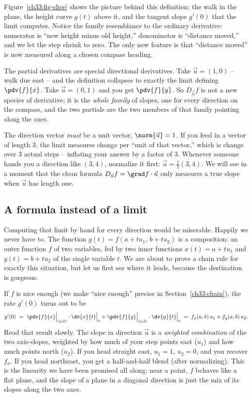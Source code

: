 Figure~\ref{ch33:fig-slice} shows the picture behind this definition: the walk in
the plane, the height curve $g(t)$ above it, and the tangent slope $g'(0)$ that the
limit computes. Notice the family resemblance to the ordinary derivative: numerator
is ``new height minus old height,'' denominator is ``distance moved,'' and we let
the step shrink to zero. The only new feature is that ``distance moved'' is now
measured along a chosen compass heading.

\begin{intuitionbox}
The partial derivatives are special directional derivatives. Take
$\vec u = (1,0)$ -- walk due east -- and the definition collapses to exactly the
limit defining $\pdv{f}{x}$. Take $\vec u=(0,1)$ and you get $\pdv{f}{y}$. So
$D_{\vec u} f$ is not a new species of derivative; it is the \emph{whole family}
of slopes, one for every direction on the compass, and the two partials are the
two members of that family pointing along the axes.
\end{intuitionbox}

\begin{trapbox}
The direction vector \emph{must} be a unit vector, $\norm{\vec u}=1$. If you feed
in a vector of length $3$, the limit measures change per ``unit of that vector,''
which is change over $3$ actual steps -- inflating your answer by a factor of
$3$. Whenever someone hands you a direction like $(3,4)$, normalize it first:
$\vec u = \tfrac{1}{5}(3,4)$. We will see in a moment that the clean formula
$D_{\vec u}f = \grad f \cdot \vec u$ only measures a true slope when $\vec u$ has
length one.
\end{trapbox}

\subsection{A formula instead of a limit}

Computing that limit by hand for every direction would be miserable. Happily we
never have to. The function $g(t)=f(a+tu_1,\,b+tu_2)$ is a composition: an outer
function $f$ of two variables, fed by two inner functions
$x(t)=a+tu_1$ and $y(t)=b+tu_2$ of the single variable $t$. We are about to prove
a chain rule for exactly this situation, but let us first see where it leads,
because the destination is gorgeous.

If $f$ is nice enough (we make ``nice enough'' precise in
Section~\ref{ch33:chain}), the rate $g'(0)$ turns out to be
\[
  g'(0) \;=\; \pdv{f}{x}\Big|_{(a,b)}\cdot \dv{x}{t}\Big|_{0}
            + \pdv{f}{y}\Big|_{(a,b)}\cdot \dv{y}{t}\Big|_{0}
        \;=\; f_x(a,b)\,u_1 + f_y(a,b)\,u_2.
\]
Read that result slowly. The slope in direction $\vec u$ is a \emph{weighted
combination} of the two axis-slopes, weighted by how much of your step points east
($u_1$) and how much points north ($u_2$). If you head straight east, $u_1=1$,
$u_2=0$, and you recover $f_x$. If you head northeast, you get a half-and-half
blend (after normalizing). This is the linearity we have been promised all along:
near a point, $f$ behaves like a flat plane, and the slope of a plane in a
diagonal direction is just the mix of its slopes along the two axes.

